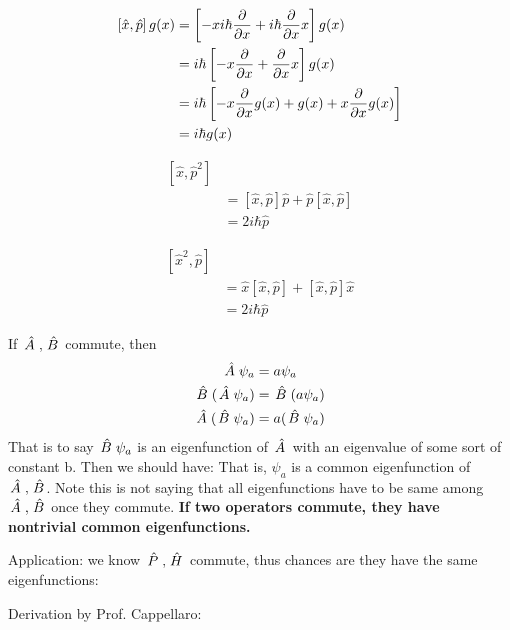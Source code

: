\documentclass{school-22.101-notes}
\begin{document}
\begin{align}
\left[ \hat{x} ,\hat{p} \right] g(x) &= \left[ -x i \hbar \frac{\partial}{\partial x} + i \hbar \frac{\partial}{\partial x} x   \right] g(x) \\
&= i \hbar \left[ -x \frac{\partial}{\partial x} + \frac{\partial}{\partial x} x \right] g(x) \\
&= i \hbar \left[ -x \frac{\partial}{\partial x} g(x) + g(x) + x \frac{\partial}{\partial x} g(x) \right] \\
&= i \hbar g(x)
\end{align}

\begin{align}
\left[ \hat{x} ,\hat{p}^2 \right] \\
&= \left[ \hat{x} ,\hat{p} \right] \hat{p} + \hat{p} \left[ \hat{x} ,\hat{p} \right] \\
&= 2 i \hbar \hat{p}
\end{align}


\begin{align}
\left[ \hat{x}^2,\hat{p} \right] \\
&= \hat{x} \left[ \hat{x} ,\hat{p} \right]  + \left[ \hat{x} ,\hat{p} \right] \hat{x} \\
&= 2 i \hbar \hat{p}
\end{align}

If $\left. \hat{A} \right., \left. \hat{B} \right.$ commute, then
\begin{align}
\left. \hat{A} \right. \psi_a &= a \psi_a \\
\left. \hat{B} \right. ( \left. \hat{A} \right. \psi_a) &= \left. \hat{B} \right. (a \psi_a ) \\
\left. \hat{A} \right. (\left. \hat{B} \right. \psi_a ) &= a (\left. \hat{B} \right. \psi_a ) 
\end{align}
That is to say $\left. \hat{B} \right. \psi_a$ is an eigenfunction of $\left. \hat{A} \right.$ with an eigenvalue of some sort of constant b. Then we should have:
That is, $\psi_a$ is a common eigenfunction of $\left. \hat{A} \right., \left. \hat{B} \right.$. Note this is not saying that all eigenfunctions have to be same among $\left. \hat{A} \right., \left. \hat{B} \right.$ once they commute. \textbf{If two operators commute, they have nontrivial common eigenfunctions.}

Application: we know $\left. \hat{P} \right., \left. \hat{H} \right.$ commute, thus chances are they have the same eigenfunctions:


Derivation by Prof. Cappellaro: 
\end{document}

